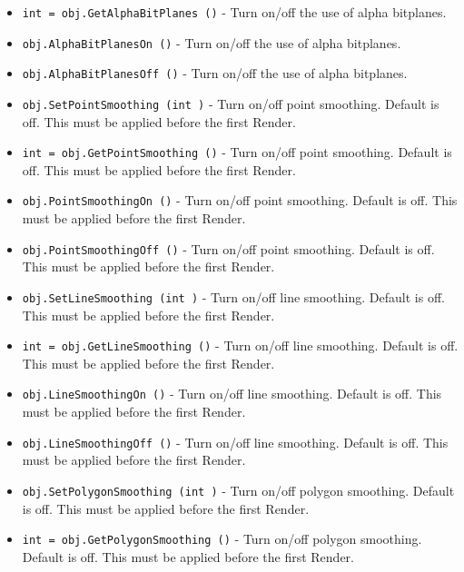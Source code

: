 \begin{itemize}
\item  \verb|int = obj.GetAlphaBitPlanes ()| -  Turn on/off the use of alpha bitplanes.

\item  \verb|obj.AlphaBitPlanesOn ()| -  Turn on/off the use of alpha bitplanes.

\item  \verb|obj.AlphaBitPlanesOff ()| -  Turn on/off the use of alpha bitplanes.

\item  \verb|obj.SetPointSmoothing (int )| -  Turn on/off point smoothing. Default is off.
 This must be applied before the first Render.

\item  \verb|int = obj.GetPointSmoothing ()| -  Turn on/off point smoothing. Default is off.
 This must be applied before the first Render.

\item  \verb|obj.PointSmoothingOn ()| -  Turn on/off point smoothing. Default is off.
 This must be applied before the first Render.

\item  \verb|obj.PointSmoothingOff ()| -  Turn on/off point smoothing. Default is off.
 This must be applied before the first Render.

\item  \verb|obj.SetLineSmoothing (int )| -  Turn on/off line smoothing. Default is off.
 This must be applied before the first Render.

\item  \verb|int = obj.GetLineSmoothing ()| -  Turn on/off line smoothing. Default is off.
 This must be applied before the first Render.

\item  \verb|obj.LineSmoothingOn ()| -  Turn on/off line smoothing. Default is off.
 This must be applied before the first Render.

\item  \verb|obj.LineSmoothingOff ()| -  Turn on/off line smoothing. Default is off.
 This must be applied before the first Render.

\item  \verb|obj.SetPolygonSmoothing (int )| -  Turn on/off polygon smoothing. Default is off.
 This must be applied before the first Render.

\item  \verb|int = obj.GetPolygonSmoothing ()| -  Turn on/off polygon smoothing. Default is off.
 This must be applied before the first Render.


\end{itemize}
